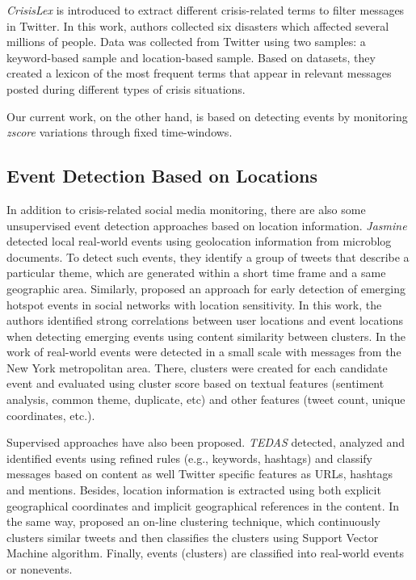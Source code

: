 \documentclass[sigconf]{acmart}
\begin{document}
\textit{CrisisLex} \cite{olteanu2014} is introduced to extract different crisis-related terms to filter messages in Twitter. In this work,
authors collected six disasters which affected several millions of people. Data was collected from Twitter using two samples: a keyword-based sample and location-based sample. Based on datasets, they created a lexicon of the most frequent terms that appear in relevant messages posted during different types of crisis situations.

Our current work, on the other hand, is based on detecting events by monitoring \textit{zscore} variations through fixed time-windows.

\subsection{Event Detection Based on Locations}

In addition to crisis-related social media monitoring, there are also some unsupervised event detection approaches based on location information. \textit{Jasmine} \cite{watanabe2011jasmine} detected local real-world events using geolocation information from microblog documents. To detect such events, they identify a group of tweets that describe a particular theme, which are generated within a short time frame and a same geographic area. Similarly, \citeauthor*{unankard2015emerging} \cite{unankard2015emerging} proposed an approach for early detection of emerging hotspot events in social networks with location sensitivity. In this work, the authors identified strong correlations between user locations and event locations when detecting emerging events using content similarity between clusters. In the work of \citeauthor{walther2013geo} \cite{walther2013geo} real-world events were detected in a small scale with messages from the New York metropolitan area. There, clusters were created for each candidate event and evaluated using cluster score based on textual features (sentiment analysis, common theme, duplicate, etc) and other features (tweet count, unique coordinates, etc.).

Supervised approaches have also been proposed. \textit{TEDAS} \cite{li2012tedas} detected, analyzed and identified events using refined rules (e.g., keywords, hashtags) and classify messages based on content as well Twitter specific features as URLs, hashtags and mentions. Besides, location information is extracted using both explicit geographical coordinates and implicit geographical references in the content. In the same way, \citeauthor{becker2011beyond} \cite{becker2011beyond} proposed an on-line clustering technique, which continuously clusters similar tweets and then classifies the clusters using Support Vector Machine algorithm. Finally, events (clusters) are classified into real-world events or nonevents.
\end{document}
